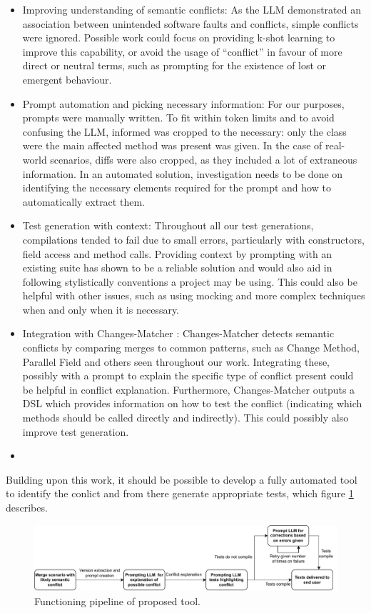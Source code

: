 \begin{itemize}
\item Improving understanding of semantic conflicts: As the LLM demonstrated an association between unintended software faults and conflicts, simple conflicts were ignored.
Possible work could focus on providing k-shot learning to improve this capability, or avoid the usage of ``conflict'' in favour of more direct or neutral terms, such as prompting
for the existence of lost or emergent behaviour.

\item Prompt automation and picking necessary information: For our purposes, prompts were manually written. To fit within token limits and to avoid confusing the LLM, informed was cropped to
the necessary: only the class were the main affected method was present was given. In the case of real-world scenarios, diffs were also cropped, as they included a lot of extraneous information.
In an automated solution, investigation needs to be done on identifying the necessary elements required for the prompt and how to automatically extract them.

\item Test generation with context: Throughout all our test generations, compilations tended to fail due to small errors, particularly with constructors, field access and method calls.
Providing context by prompting with an existing suite has shown to be a reliable solution and would also aid in following stylistically conventions a project may be using.
This could also be helpful with other issues, such as using mocking and more complex techniques when and only when it is necessary.

\item Integration with Changes-Matcher \cite{kn:nuno}: Changes-Matcher detects semantic conflicts by comparing merges to common patterns, such as Change Method, Parallel Field and others
seen throughout our work. Integrating these, possibly with a prompt to explain the specific type of conflict present could be helpful in conflict explanation.
Furthermore, Changes-Matcher outputs a DSL which provides information on how to test the conflict (indicating which methods should be called directly and indirectly). This could possibly
also improve test generation.

\item {}
\end{itemize}

Building upon this work, it should be possible to develop a fully automated tool to identify the conlict and from there generate appropriate tests,
which figure \ref{fig:tool} describes.
\begin{figure}
    \centering
    \includegraphics[width=1\linewidth]{figures/tool.pdf}
    \caption{Functioning pipeline of proposed tool.}
    \label{fig:tool}
\end{figure}